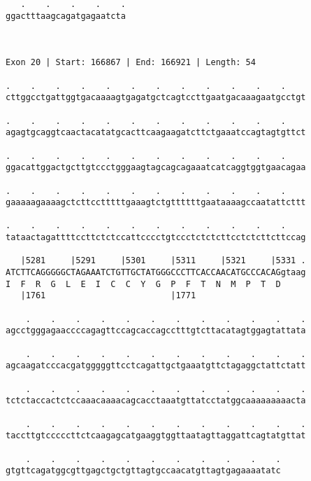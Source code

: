 \documentclass{article}
\begin{document}
\begin{Verbatim}
   .    .    .    .    .
ggactttaagcagatgagaatcta
                        
                        
 
Exon 20 | Start: 166867 | End: 166921 | Length: 54
 
.    .    .    .    .    .    .    .    .    .    .    .    
cttggcctgattggtgacaaaagtgagatgctcagtccttgaatgacaaagaatgcctgt
                                                            
.    .    .    .    .    .    .    .    .    .    .    .    
agagtgcaggtcaactacatatgcacttcaagaagatcttctgaaatccagtagtgttct
                                                            
.    .    .    .    .    .    .    .    .    .    .    .    
ggacattggactgcttgtccctgggaagtagcagcagaaatcatcaggtggtgaacagaa
                                                            
.    .    .    .    .    .    .    .    .    .    .    .    
gaaaaagaaaagctcttcctttttgaaagtctgttttttgaataaaagccaatattcttt
                                                            
.    .    .    .    .    .    .    .    .    .    .    .    
tataactagattttccttctctccattcccctgtccctctctcttcctctcttcttccag
                                                            
   |5281     |5291     |5301     |5311     |5321     |5331 .
ATCTTCAGGGGGCTAGAAATCTGTTGCTATGGGCCCTTCACCAACATGCCCACAGgtaag
I  F  R  G  L  E  I  C  C  Y  G  P  F  T  N  M  P  T  D     
   |1761                         |1771                      
  
    .    .    .    .    .    .    .    .    .    .    .    .
agcctgggagaaccccagagttccagcaccagcctttgtcttacatagtggagtattata
                                                            
    .    .    .    .    .    .    .    .    .    .    .    .
agcaagatcccacgatgggggttcctcagattgctgaaatgttctagaggctattctatt
                                                            
    .    .    .    .    .    .    .    .    .    .    .    .
tctctaccactctccaaacaaaacagcacctaaatgttatcctatggcaaaaaaaaacta
                                                            
    .    .    .    .    .    .    .    .    .    .    .    .
taccttgtcccccttctcaagagcatgaaggtggttaatagttaggattcagtatgttat
                                                            
    .    .    .    .    .    .    .    .    .    .    .
gtgttcagatggcgttgagctgctgttagtgccaacatgttagtgagaaaatatc
                                                       

\end{Verbatim}
\end{document}
